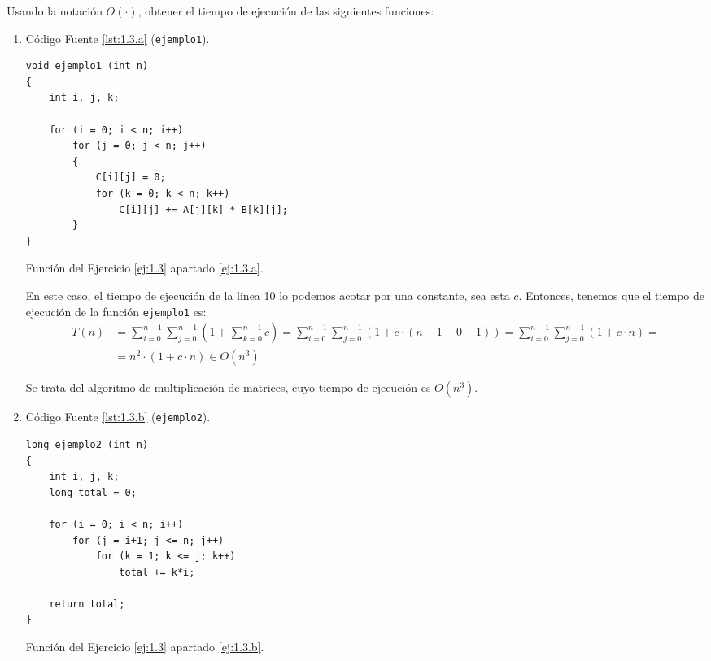 \begin{ejercicio}\label{ej:1.3}
    Usando la notación $O(\cdot)$, obtener el tiempo de ejecución de las siguientes funciones:
    \begin{enumerate}
        \item \label{ej:1.3.a} Código Fuente \ref{lst:1.3.a} (\verb|ejemplo1|).
        \begin{listing}[H]
            \begin{verbatim}
void ejemplo1 (int n)
{
    int i, j, k;

    for (i = 0; i < n; i++)
        for (j = 0; j < n; j++)
        {
            C[i][j] = 0;
            for (k = 0; k < n; k++)
                C[i][j] += A[j][k] * B[k][j];
        }
}
            \end{verbatim}
            \caption{Función del Ejercicio \ref{ej:1.3} apartado \ref{ej:1.3.a}.}
            \label{lst:1.3.a}
        \end{listing}

        En este caso, el tiempo de ejecución de la linea 10 lo podemos acotar por una constante, sea esta $c$.
        Entonces, tenemos que el tiempo de ejecución de la función \verb|ejemplo1| es:
        \begin{align*}
            T(n)&=\sum_{i=0}^{n-1} \sum_{j=0}^{n-1} \left(1+ \sum_{k=0}^{n-1} c\right)
            = \sum_{i=0}^{n-1} \sum_{j=0}^{n-1} (1+c\cdot (n-1-0+1))
            = \sum_{i=0}^{n-1} \sum_{j=0}^{n-1} (1+c\cdot n)
            =\\&= n^2\cdot (1+c\cdot n) \in O(n^3)
        \end{align*}

        Se trata del algoritmo de multiplicación de matrices, cuyo tiempo de ejecución es $O(n^3)$.

        \item \label{ej:1.3.b} Código Fuente \ref{lst:1.3.b} (\verb|ejemplo2|).
        \begin{listing}[H]
            \begin{verbatim}
long ejemplo2 (int n)
{
    int i, j, k;
    long total = 0;

    for (i = 0; i < n; i++)
        for (j = i+1; j <= n; j++)
            for (k = 1; k <= j; k++)
                total += k*i;

    return total;
}
            \end{verbatim}
            \caption{Función del Ejercicio \ref{ej:1.3} apartado \ref{ej:1.3.b}.}
            \label{lst:1.3.b}
        \end{listing}


\end{enumerate}
\end{ejercicio}
